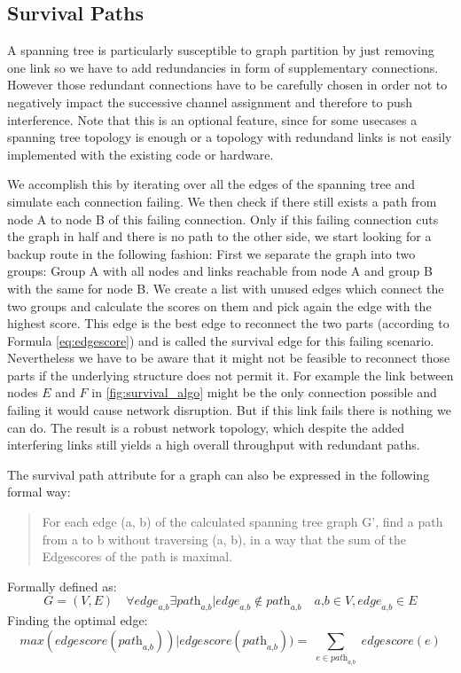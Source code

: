     \subsection{Survival Paths}
      A spanning tree is particularly susceptible to graph partition by just removing one link so we have to add redundancies in form of supplementary connections.
      However those redundant connections have to be carefully chosen in order not to negatively impact the successive channel assignment and therefore to push interference.
      Note that this is an optional feature, since for some usecases a spanning tree topology is enough or a topology with redundand links is not easily implemented
      with the existing code or hardware.  
      
      We accomplish this by iterating over all the edges of the spanning tree and simulate each connection failing. 
      We then check if there still exists a path from node A to node B of this failing connection. 
      Only if this failing connection cuts the graph in half and there is no path to the other side,
      we start looking for a backup route in the following fashion:
      First we separate the graph into two groups: Group A with all nodes and links reachable from node A and group B with the same for node B.
      We create a list with unused edges which connect the two groups and calculate the scores on them and pick again the edge with the highest score.
      This edge is the best edge to reconnect the two parts (according to Formula \ref{eq:edgescore}) and is called the survival edge for this failing scenario.
      Nevertheless we have to be aware that it might not be feasible to reconnect those parts if the underlying structure does not permit it.
      For example the link between nodes \(E\) and \(F\) in \ref{fig:survival_algo} might be the only connection possible and failing it would cause network disruption.
      But if this link fails there is nothing we can do. The result is a robust network topology, 
      which despite the added interfering links still yields a high overall throughput with redundant paths.

      The survival path attribute for a graph can also be expressed in the following formal way:
      \begin{quote}
	For each edge (a, b) of the calculated spanning tree graph G', find a path from a to b without traversing (a, b), 
	in a way that the sum of the Edgescores of the path is maximal.
      \end{quote}
      Formally defined as:
      $$\textit{G}=(\textit{V},\textit{E}) \quad
	\forall \textit{edge}_\textit{a,b} \exists \textit{path}_\textit{a,b} | \textit{edge}_\textit{a,b} \notin \textit{path}_\textit{a,b} \quad
	\textit{a,b} \in \textit{V}, \textit{edge}_\textit{a,b} \in \textit{E}$$
	Finding the optimal edge:
	$$\textit{max}(\textit{edgescore}(\textit{path}_\textit{a,b})) |
	\textit{edgescore}(\textit{path}_\textit{a,b})) = \sum_{\substack{e \in \textit{path}_\textit{a,b}}} \textit{edgescore}(e)$$
	
